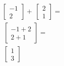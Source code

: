 \documentclass[preview]{standalone}
\begin{document}
\begin{align*}
\begin{bmatrix}-1\\2\end{bmatrix}+\
                \begin{bmatrix}2\\1\end{bmatrix}=\\ \
                \begin{bmatrix}-1+2\\2+1\end{bmatrix}=\\ \
                    \begin{bmatrix}1\\3\end{bmatrix}
\end{align*}
\end{document}

